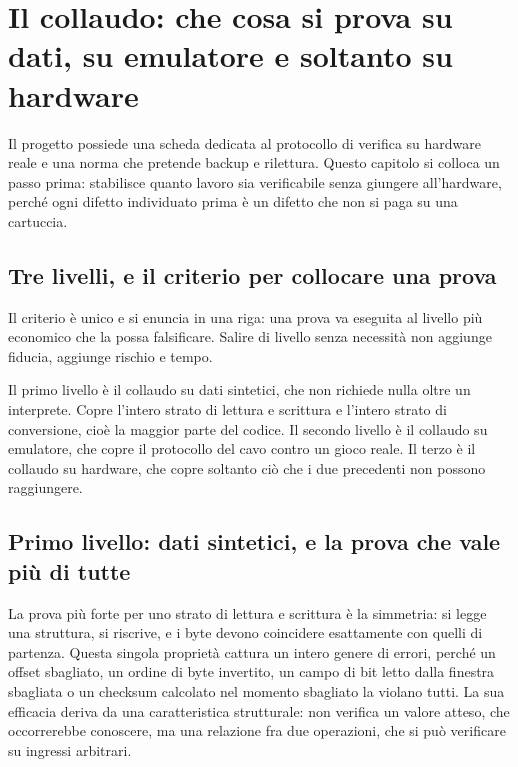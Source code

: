
\chapter{Il collaudo: che cosa si prova su dati, su emulatore e soltanto su hardware}
\label{cap:collaudo}

Il progetto possiede una scheda dedicata al protocollo di verifica su hardware reale e una norma che pretende backup e rilettura. Questo capitolo si colloca un passo prima: stabilisce quanto lavoro sia verificabile senza giungere all'hardware, perché ogni difetto individuato prima è un difetto che non si paga su una cartuccia.

\section{Tre livelli, e il criterio per collocare una prova}

Il criterio è unico e si enuncia in una riga: una prova va eseguita al livello più economico che la possa falsificare. Salire di livello senza necessità non aggiunge fiducia, aggiunge rischio e tempo.

Il primo livello è il collaudo su dati sintetici, che non richiede nulla oltre un interprete. Copre l'intero strato di lettura e scrittura e l'intero strato di conversione, cioè la maggior parte del codice. Il secondo livello è il collaudo su emulatore, che copre il protocollo del cavo contro un gioco reale. Il terzo è il collaudo su hardware, che copre soltanto ciò che i due precedenti non possono raggiungere.

\section{Primo livello: dati sintetici, e la prova che vale più di tutte}

La prova più forte per uno strato di lettura e scrittura è la simmetria: si legge una struttura, si riscrive, e i byte devono coincidere esattamente con quelli di partenza. Questa singola proprietà cattura un intero genere di errori, perché un offset sbagliato, un ordine di byte invertito, un campo di bit letto dalla finestra sbagliata o un checksum calcolato nel momento sbagliato la violano tutti. La sua efficacia deriva da una caratteristica strutturale: non verifica un valore atteso, che occorrerebbe conoscere, ma una relazione fra due operazioni, che si può verificare su ingressi arbitrari.

